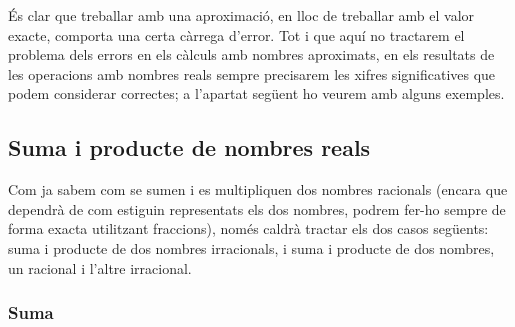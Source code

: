 És clar que treballar amb una aproximació, en lloc de treballar amb el
valor exacte, comporta una certa càrrega d’error. Tot i que aquí no
tractarem el problema dels errors en els càlculs amb nombres
aproximats, en els resultats de les operacions amb nombres reals
sempre precisarem les xifres significatives que podem considerar
correctes; a l’apartat següent ho veurem amb alguns exemples.

\subsection{Suma i producte de nombres reals}

Com ja sabem com se sumen i es multipliquen dos nombres racionals
(encara que dependrà de com estiguin representats els dos nombres, podrem fer-ho sempre de forma exacta utilitzant fraccions), només caldrà tractar els dos casos següents: suma i producte de
dos nombres irracionals, i suma i producte de dos nombres, un
racional i l’altre irracional.

\subsubsection{Suma}

